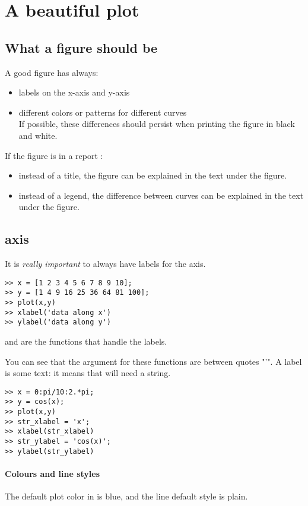 \section{A beautiful plot}
\subsection{What a figure should be}

	A good figure has {\color{red} \large always}:
	\begin{itemize}
		\item labels on the x-axis and y-axis
		\item different colors or patterns for different curves\\ If possible, these differences should persist when printing the figure in black and white.
	\end{itemize}
	If the figure is in a report :
	\begin{itemize}
		\item instead of a title, the figure can be explained in the text under the figure.
		\item instead of a legend, the difference between curves can be explained in the text under the figure.
	\end{itemize}



\subsection{axis}
It is \emph{really important} to always have labels for the axis.

\begin{lstlisting}
>> x = [1 2 3 4 5 6 7 8 9 10];
>> y = [1 4 9 16 25 36 64 81 100];
>> plot(x,y)
>> xlabel('data along x')
>> ylabel('data along y')
\end{lstlisting}

 and  are the \matlab functions that handle the labels.

You can see that the argument for these functions are between quotes "'".
A label is some text: it means that \matlab will need a string.


\begin{lstlisting}
>> x = 0:pi/10:2.*pi;
>> y = cos(x);
>> plot(x,y)
>> str_xlabel = 'x';
>> xlabel(str_xlabel)
>> str_ylabel = 'cos(x)';
>> ylabel(str_ylabel)
\end{lstlisting}

\paragraph{Colours and line styles}
The default plot color in \matlab is blue, and the line default style is plain.



